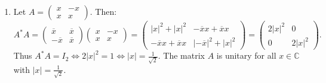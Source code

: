 \begin{exercisesolution*}
\label{sol:hermitian_trace_subspaces_sc}
\begin{enumerate}[label=\textbf{(\alph*)}]
    \item Let $A = \left(\begin{smallmatrix} x & -x \\ x & x \end{smallmatrix}\right)$. Then:
    \[
    A^* A = \begin{pmatrix} \overline{x} & \overline{x} \\ -\overline{x} & \overline{x} \end{pmatrix} \begin{pmatrix} x & -x \\ x & x \end{pmatrix} = \begin{pmatrix} |x|^2 + |x|^2 & -\overline{x}x + \overline{x}x \\ -\overline{x}x + \overline{x}x & |-\overline{x}|^2 + |x|^2 \end{pmatrix} = \begin{pmatrix} 2|x|^2 & 0 \\ 0 & 2|x|^2 \end{pmatrix}.
    \]
    Thus $A^* A = I_2 \iff 2|x|^2 = 1 \iff |x| = \frac{1}{\sqrt{2}}$.
    The matrix $A$ is unitary for all $x \in \mathbb{C}$ with $|x| = \frac{1}{\sqrt{2}}$.


\end{enumerate}
\end{exercisesolution*}
